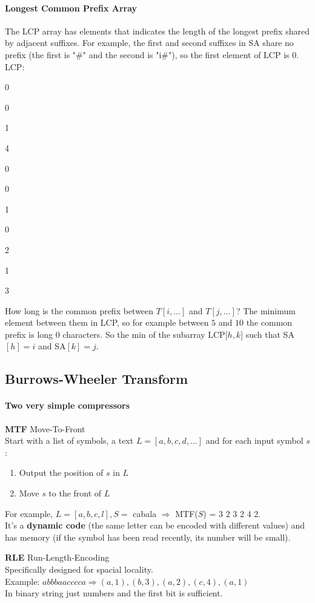 \documentclass[10pt]{report}
\begin{document}
\paragraph{Longest Common Prefix Array} The LCP array has elements that indicates the length of the longest prefix shared by adjacent suffixes. For example, the first and second suffixes in SA share no prefix (the first is "\#" and the second is "i\#"), so the first element of LCP is 0. LCP:
\begin{list}{}{}
	\item 0
	\item 0
	\item 1
	\item 4
	\item 0
	\item 0
	\item 1
	\item 0
	\item 2
	\item 1
	\item 3
\end{list}
How long is the common prefix between $T[i,\ldots]$ and $T[j,\ldots]$? The minimum element between them in LCP, so for example between $5$ and $10$ the common prefix is long $0$ characters. So the min of the subarray LCP[$h,k$] such that SA$[h]=i$ and SA$[k]=j$.
\subsection{Burrows-Wheeler Transform}
\paragraph{Two very simple compressors}
\begin{list}{}{}
	\item \textbf{MTF} Move-To-Front\\
	Start with a list of symbols, a text $L=[a,b,c,d,\ldots]$ and for each input symbol $s$:
	\begin{enumerate}
		\item Output the position of $s$ in $L$
		\item Move $s$ to the front of $L$
	\end{enumerate}
	For example, $L=[a,b,c,l], S =$ cabala $\Rightarrow$ MTF($S$) = 3 2 3 2 4 2.\\
	It's a \textbf{dynamic code} (the same letter can be encoded with different values) and has memory (if the symbol has been read recently, its number will be small).
	\item \textbf{RLE} Run-Length-Encoding\\
	Specifically designed for spacial locality.\\
	Example: $abbbaacccca \Rightarrow (a,1),(b,3),(a,2),(c,4),(a,1)$\\
	In binary string just numbers and the first bit is sufficient.
\end{list}
\end{document}
